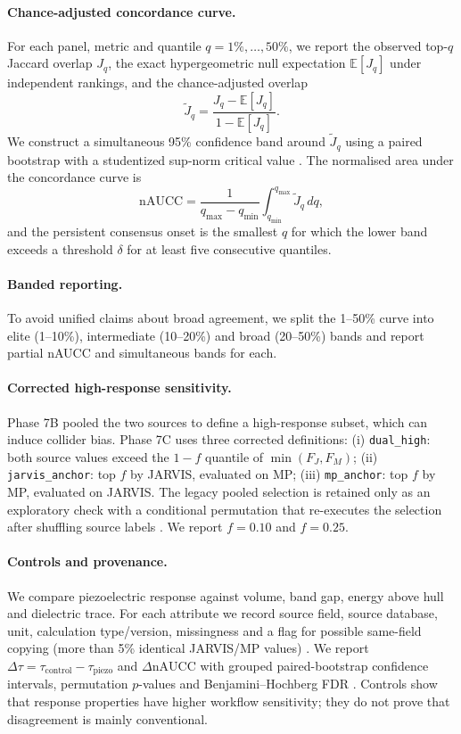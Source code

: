 \documentclass[11pt]{article}
\begin{document}
\paragraph{Chance-adjusted concordance curve.}
For each panel, metric and quantile $q=1\%,\dots,50\%$, we report the observed top-$q$ Jaccard overlap $J_q$, the exact hypergeometric null expectation $\mathbb{E}[J_q]$ under independent rankings, and the chance-adjusted overlap
\begin{equation}
\widetilde J_q = \frac{J_q - \mathbb{E}[J_q]}{1 - \mathbb{E}[J_q]}.
\end{equation}
We construct a simultaneous 95\% confidence band around $\widetilde J_q$ using a paired bootstrap with a studentized sup-norm critical value \cite{efron1994,romano2005}.
The normalised area under the concordance curve is
\begin{equation}
\mathrm{nAUCC} = \frac{1}{q_{\max}-q_{\min}} \int_{q_{\min}}^{q_{\max}} \widetilde J_q \,dq,
\end{equation}
and the persistent consensus onset is the smallest $q$ for which the lower band exceeds a threshold $\delta$ for at least five consecutive quantiles.

\paragraph{Banded reporting.}
To avoid unified claims about broad agreement, we split the 1--50\% curve into elite (1--10\%), intermediate (10--20\%) and broad (20--50\%) bands and report partial nAUCC and simultaneous bands for each.

\paragraph{Corrected high-response sensitivity.}
Phase 7B pooled the two sources to define a high-response subset, which can induce collider bias.
Phase 7C uses three corrected definitions:
(i) \texttt{dual\_high}: both source values exceed the $1-f$ quantile of $\min(F_J,F_M)$;
(ii) \texttt{jarvis\_anchor}: top $f$ by JARVIS, evaluated on MP;
(iii) \texttt{mp\_anchor}: top $f$ by MP, evaluated on JARVIS.
The legacy pooled selection is retained only as an exploratory check with a conditional permutation that re-executes the selection after shuffling source labels \cite{efron1994}.
We report $f=0.10$ and $f=0.25$.

\paragraph{Controls and provenance.}
We compare piezoelectric response against volume, band gap, energy above hull and dielectric trace.
For each attribute we record source field, source database, unit, calculation type/version, missingness and a flag for possible same-field copying (more than 5\% identical JARVIS/MP values) \cite{wilkinson2016}.
We report $\Delta\tau = \tau_{\text{control}} - \tau_{\text{piezo}}$ and $\Delta\mathrm{nAUCC}$ with grouped paired-bootstrap confidence intervals, permutation $p$-values and Benjamini--Hochberg FDR \cite{benjamini1995}.
Controls show that response properties have higher workflow sensitivity; they do not prove that disagreement is mainly conventional.
\end{document}
